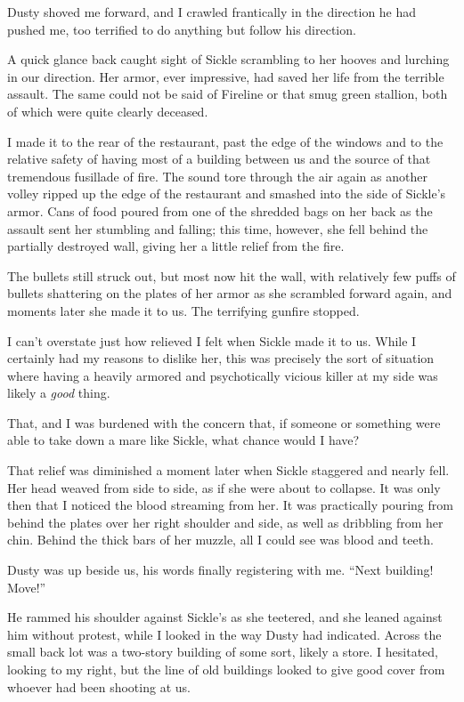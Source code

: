Dusty shoved me forward, and I crawled frantically in the direction he had pushed me, too terrified to do anything but follow his direction.

A quick glance back caught sight of Sickle scrambling to her hooves and lurching in our direction. Her armor, ever impressive, had saved her life from the terrible assault. The same could not be said of Fireline or that smug green stallion, both of which were quite clearly deceased.

I made it to the rear of the restaurant, past the edge of the windows and to the relative safety of having most of a building between us and the source of that tremendous fusillade of fire. The sound tore through the air again as another volley ripped up the edge of the restaurant and smashed into the side of Sickle’s armor. Cans of food poured from one of the shredded bags on her back as the assault sent her stumbling and falling; this time, however, she fell behind the partially destroyed wall, giving her a little relief from the fire.

The bullets still struck out, but most now hit the wall, with relatively few puffs of bullets shattering on the plates of her armor as she scrambled forward again, and moments later she made it to us. The terrifying gunfire stopped.

I can’t overstate just how relieved I felt when Sickle made it to us. While I certainly had my reasons to dislike her, this was precisely the sort of situation where having a heavily armored and psychotically vicious killer at my side was likely a \textit{good} thing.

That, and I was burdened with the concern that, if someone or something were able to take down a mare like Sickle, what chance would I have?

That relief was diminished a moment later when Sickle staggered and nearly fell. Her head weaved from side to side, as if she were about to collapse. It was only then that I noticed the blood streaming from her. It was practically pouring from behind the plates over her right shoulder and side, as well as dribbling from her chin. Behind the thick bars of her muzzle, all I could see was blood and teeth.

Dusty was up beside us, his words finally registering with me. “Next building! Move!”

He rammed his shoulder against Sickle’s as she teetered, and she leaned against him without protest, while I looked in the way Dusty had indicated. Across the small back lot was a two-story building of some sort, likely a store. I hesitated, looking to my right, but the line of old buildings looked to give good cover from whoever had been shooting at us.

